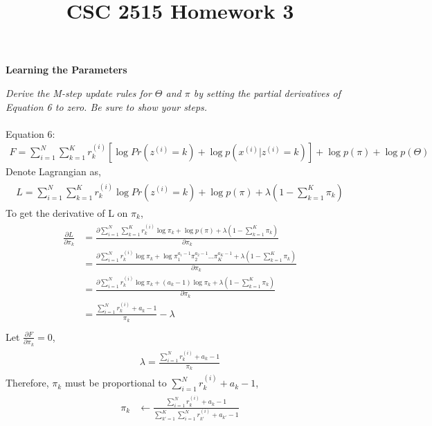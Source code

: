 \documentclass{myhw}
\title{CSC 2515 Homework 3}
\begin{document}
\begin{homeworkProblem}
\textbf{Learning the Parameters} 
\begin{homeworkSection}	
\emph{Derive the M-step update rules for $\Theta$ and $\pi$ by setting the partial derivatives of Equation 6 to zero. Be sure to show your steps.} \\
\\
Equation 6:
\begin{gather*}
F = \sum_{i=1}^{N}\sum_{k=1}^{K}r_k^{(i)}[\log{Pr(z^{(i)}=k)}+\log{p(x^{(i)}|z^{(i)}=k)}]+\log{p(\pi)}+\log{p(\Theta)}
\end{gather*}
Denote Lagrangian as, 
\begin{gather*}
\begin{aligned}
L = \sum_{i=1}^{N}\sum_{k=1}^{K}r_k^{(i)} \log{Pr(z^{(i)}=k)} + \log{p(\pi)} + \lambda (1 - \sum_{k=1}^K{\pi_k})
\end{aligned}
\end{gather*}
To get the derivative of L on $\pi_k$,
\begin{gather*}
\begin{aligned}
\frac{\partial L}{\partial \pi_k} & = \frac{\partial \sum_{i=1}^{N}\sum_{k=1}^{K}r_k^{(i)} \log{\pi_k} + \log{p(\pi)} + \lambda (1 - \sum_{k=1}^K{\pi_k}) }{\partial \pi_k} \\
& = \frac{\partial \sum_{i=1}^{N} r_k^{(i)} \log{\pi_k} + \log{ \pi_1^{a_1-1} \pi_2^{a_2-1} ... \pi_K^{a_K-1} } + \lambda (1 - \sum_{k=1}^K{\pi_k}) }{\partial \pi_k} \\
& = \frac{\partial \sum_{i=1}^{N} r_k^{(i)} \log{\pi_k} + (a_k-1)\log{\pi_k} + \lambda (1 - \sum_{k=1}^K{\pi_k}) }{\partial \pi_k} \\
& = \frac{\sum_{i=1}^{N} r_k^{(i)} + a_k - 1}{\pi_k} - \lambda \\
\end{aligned}
\end{gather*}
Let $ \frac{\partial F}{\partial \pi_k} = 0$,
\begin{gather*}
\begin{aligned}
\lambda = \frac{\sum_{i=1}^{N} r_k^{(i)} + a_k - 1}{\pi_k}
\end{aligned}
\end{gather*}
Therefore, $\pi_k$ must be proportional to $\sum_{i=1}^{N} r_k^{(i)} + a_k - 1$,
\begin{gather*}
\begin{aligned}
\pi_k & \leftarrow \frac{\sum_{i=1}^{N} r_k^{(i)} + a_k - 1}{\sum_{k'=1}^K \sum_{i=1}^{N} r_{k'}^{(i)} + a_{k'} - 1} \\

\end{aligned}
\end{gather*}
\end{homeworkSection}
\end{homeworkProblem}
\end{document}
